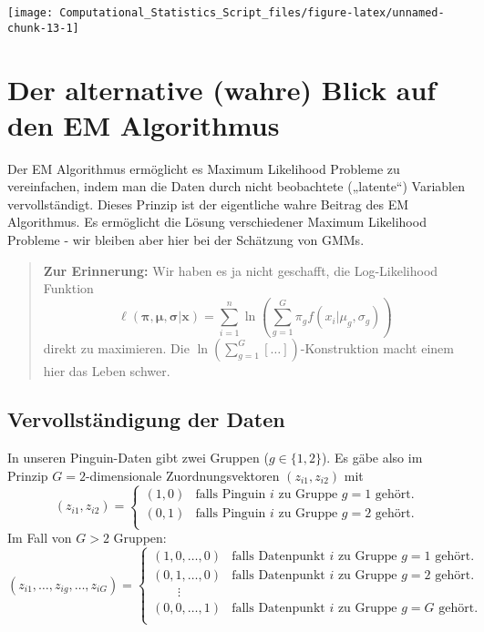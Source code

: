 \documentclass[
  ngerman,
]{book}
\begin{document}
\begin{center}\texttt{[image: Computational\_Statistics\_Script\_files/figure-latex/unnamed-chunk-13-1]} \end{center}

\hypertarget{der-alternative-wahre-blick-auf-den-em-algorithmus}{%
\section{Der alternative (wahre) Blick auf den EM Algorithmus}\label{der-alternative-wahre-blick-auf-den-em-algorithmus}}

Der EM Algorithmus ermöglicht es Maximum Likelihood Probleme zu vereinfachen, indem man die Daten durch nicht beobachtete („latente``) Variablen vervollständigt. Dieses Prinzip ist der eigentliche wahre Beitrag des EM Algorithmus. Es ermöglicht die Lösung verschiedener Maximum Likelihood Probleme - wir bleiben aber hier bei der Schätzung von GMMs.

\begin{quote}
\textbf{Zur Erinnerung:} Wir haben es ja nicht geschafft, die Log-Likelihood Funktion
\[
\ell(\boldsymbol{\pi},\boldsymbol{\mu},\boldsymbol{\sigma}|\mathbf{x})
=\sum_{i=1}^n\ln\left(\sum_{g=1}^G\pi_gf(x_i|\mu_g,\sigma_g)\right)
\]
direkt zu maximieren. Die \(\ln(\sum_{g=1}^G[\dots])\)-Konstruktion macht einem hier das Leben schwer.
\end{quote}

\hypertarget{vervollstuxe4ndigung-der-daten}{%
\subsection{Vervollständigung der Daten}\label{vervollstuxe4ndigung-der-daten}}

In unseren Pinguin-Daten gibt zwei Gruppen (\(g\in\{1,2\}\)). Es gäbe also im Prinzip \(G=2\)-dimensionale Zuordnungsvektoren \((z_{i1},z_{i2})\) mit
\[
(z_{i1},z_{i2})=
\left\{\begin{array}{ll}
(1,0)&\text{falls Pinguin }i\text{ zu Gruppe }g=1\text{ gehört.}\\
(0,1)&\text{falls Pinguin }i\text{ zu Gruppe }g=2\text{ gehört.}\\
\end{array}\right.
\]
Im Fall von \(G>2\) Gruppen:\\
\[
(z_{i1},\dots,z_{ig},\dots,z_{iG})=
\left\{\begin{array}{ll}
(1,0,\dots,0)&\text{falls Datenpunkt }i\text{ zu Gruppe }g=1\text{ gehört.}\\
(0,1,\dots,0)&\text{falls Datenpunkt }i\text{ zu Gruppe }g=2\text{ gehört.}\\
\quad\quad\vdots&\\
(0,0,\dots,1)&\text{falls Datenpunkt }i\text{ zu Gruppe }g=G\text{ gehört.}\\
\end{array}\right.
\]
\end{document}

